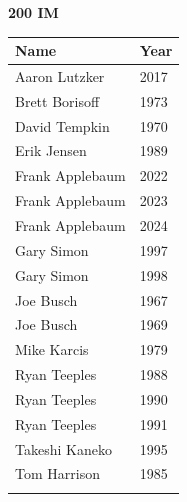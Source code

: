 \begin{minipage}[t]{0.48\textwidth}
\centering
\textbf{\textcolor{teamprimary}{200 IM}}\par
\vspace{0.5em}
\centering
\small
\renewcommand{\arraystretch}{1.0}
\setlength{\tabcolsep}{4pt}
\begin{tabular}{@{}p{3.0cm}p{1.0cm}@{}}
\toprule
\textbf{Name} & \textbf{Year} \\
\midrule
Aaron Lutzker & 2017 \\
Brett Borisoff & 1973 \\
David Tempkin & 1970 \\
Erik Jensen & 1989 \\
Frank Applebaum & 2022 \\
Frank Applebaum & 2023 \\
Frank Applebaum & 2024 \\
Gary Simon & 1997 \\
Gary Simon & 1998 \\
Joe Busch & 1967 \\
Joe Busch & 1969 \\
Mike Karcis & 1979 \\
Ryan Teeples & 1988 \\
Ryan Teeples & 1990 \\
Ryan Teeples & 1991 \\
Takeshi Kaneko & 1995 \\
Tom Harrison & 1985 \\
\bottomrule
\vspace{0.5em}
\end{tabular}
\end{minipage}
\vspace{1.2em}
